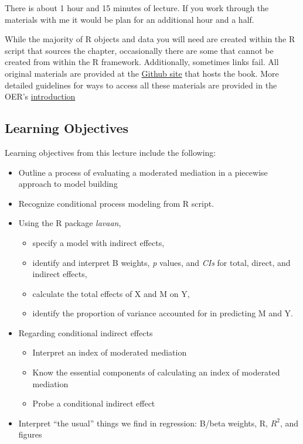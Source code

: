 \documentclass[
]{book}
\providecommand{\tightlist}{%
  \setlength{\itemsep}{0pt}\setlength{\parskip}{0pt}}
\begin{document}
There is about 1 hour and 15 minutes of lecture. If you work through the materials with me it would be plan for an additional hour and a half.

While the majority of R objects and data you will need are created within the R script that sources the chapter, occasionally there are some that cannot be created from within the R framework. Additionally, sometimes links fail. All original materials are provided at the \href{https://https://github.com/lhbikos/ReC_MultivModel}{Github site} that hosts the book. More detailed guidelines for ways to access all these materials are provided in the OER's \protect\hyperlink{ReCintro}{introduction}

\hypertarget{learning-objectives-7}{%
\subsection{Learning Objectives}\label{learning-objectives-7}}

Learning objectives from this lecture include the following:

\begin{itemize}
\tightlist
\item
  Outline a process of evaluating a moderated mediation in a piecewise \citep{hayes_introduction_2018} approach to model building
\item
  Recognize conditional process modeling from R script.
\item
  Using the R package \emph{lavaan},

  \begin{itemize}
  \tightlist
  \item
    specify a model with indirect effects,
  \item
    identify and interpret B weights, \emph{p} values, and \emph{CIs} for total, direct, and indirect effects,\\
  \item
    calculate the total effects of X and M on Y,
  \item
    identify the proportion of variance accounted for in predicting M and Y.
  \end{itemize}
\item
  Regarding conditional indirect effects

  \begin{itemize}
  \tightlist
  \item
    Interpret an index of moderated mediation
  \item
    Know the essential components of calculating an index of moderated mediation
  \item
    Probe a conditional indirect effect
  \end{itemize}
\item
  Interpret ``the usual'' things we find in regression: B/beta weights, R, \(R^{2}\), and figures
\end{itemize}
\end{document}
